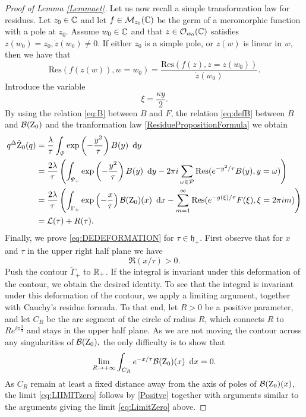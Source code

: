 \begin{proof}[Proof of Lemma \ref{Lemmaet}]
Let us now recall a simple transformation law for residues. Let $z_0\in \mathbb{C}$ and let $f\in \mathcal{M}_{z_0}(\mathbb{C})$ be the germ of a meromorphic function with a pole at $z_0.$ Assume $w_0 \in \mathbb{C}$ and that $z \in \mathcal{O}_{w_0}(\mathbb{C})$ satisfies $z(w_0)=z_0, \dot{z}(w_0)\not=0.$ If either $z_0$ is a simple pole, or $z(w)$ is linear in $w,$ then we have that
\begin{equation} \label{ResiduePropositionFormula}
\text{Res}(f(z(w)), w=w_0)= \frac{\text{Res}(f(z),z=z(w_0))}{\dot{z}(w_0)}.
\end{equation} 
 Introduce the variable
\begin{equation} \label{eq:xi}
\xi= \frac{\kappa y}{2}.
\end{equation} By using the relation \eqref{eq:B} between $B$ and $F$, the relation \eqref{eq:defB}  between $B$ and $\mathcal{B}(\operatorname{Z}_0)$ and the tranformation law \eqref{ResiduePropositionFormula} we obtain
\begin{align} \begin{split} 
q^{\Delta} \hat{\operatorname{Z}}_0(q)& = \frac{\lambda}{\tau} \int_{\varPsi} \exp\left(-\frac{y^2}{\tau}\right) B(y) \ \operatorname{{d}\hskip-.6mm} y
\\&=\frac{2\lambda}{\tau} \left( \int_{\varPsi_+} \exp\left(-\frac{y^2}{\tau}\right) B(y) \ \operatorname{{d}\hskip-.6mm} y -  2\pi i\sum_{\omega \in \mathcal{P}} \operatorname{Res}(e^{-y^2/\tau}B(y), y=\omega)  \right)
\\ &= \frac{2\lambda}{\tau} \left( \int_{\Gamma_+} \exp\left(-\frac{x}{\tau}\right) \mathcal{B}(\operatorname{Z}_0)(x) \ \operatorname{{d}\hskip-.6mm} x -  \sum_{m=1}^{\infty} \operatorname{Res}(e^{-g(\xi)/\tau}F(\xi), \xi=2\pi i m) \right)
\\ &= \mathcal{L}(\tau)+R(\tau). \end{split}
\end{align}
Finally, we prove \eqref{eq:DEDEFORMATION} for $\tau \in \mathfrak{h}_+$. First observe that for $x$ and $\tau$ in the upper right half plane we have
\begin{equation} \label{Positve}
\Re(x/\tau) >0.
\end{equation} Push the contour $\tilde{\Gamma}_+$  to $\mathbb{R}_+$. If the integral is invariant under this deformation of the contour, we obtain the desired identity. To see that the  integral is invariant under this deformation of the contour, we apply a limiting argument, together with Cauchy's residue formula. To that end, let $R>0$ be a positive parameter, and let $C_R$ be the  arc segment of the circle of radius $R$, which connects $R$ to $Re^{i\pi \frac{3}{4}}$ and stays in the upper half plane. As we are not moving the contour across any singularities of $\mathcal{B}(\operatorname{Z}_0),$ the only difficulty is to show that 
\begin{equation} \label{eq:LIIMITzero}
\lim_{R\rightarrow +\infty} \int_{ C_R} e^{-x / \tau} \mathcal{B}(\operatorname{Z}_0)(x) \ \operatorname{{d}\hskip-.6mm} x=0.
\end{equation}
As $C_R$ remain at least a fixed distance away from the axis of poles of $\mathcal{B}(\operatorname{Z}_0)(x)$, the limit \eqref{eq:LIIMITzero} follows by \eqref{Positve} together with arguments similar to the arguments giving the limit \eqref{eq:LimitZero} above.  \end{proof}


